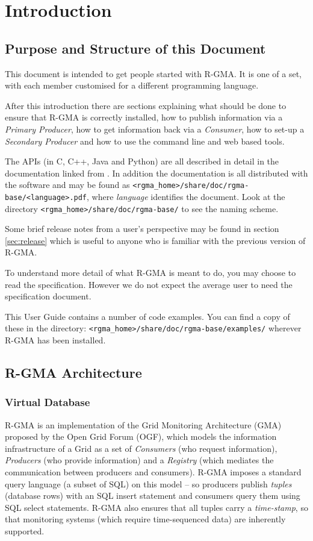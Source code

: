 \section{Introduction} 
\label{sec:Introduction}

\subsection{Purpose and Structure of this Document}

This document is intended to get people started with R-GMA. It is one
of a set, with each member customised for a different programming
language.

After this introduction there are sections explaining what should be
done to ensure that R-GMA is correctly installed, how to publish
information via a \emph{Primary Producer}, how to get information back
via a \emph{Consumer}, how to set-up a \emph{Secondary Producer} and
how to use the command line and web based tools.

The APIs (in C, C++, Java and Python) are all described in detail in
the documentation linked from \toppage. In addition the documentation
is all distributed with the software and may be found as
\verb!<rgma_home>/share/doc/rgma-base/<language>.pdf!, where
\emph{language} identifies the document.  Look at the directory
\verb!<rgma_home>/share/doc/rgma-base/!  to see the naming scheme.

Some brief release notes from a user's perspective may be found in
section \ref{sec:release} which is useful to anyone who is familiar
with the previous version of R-GMA.

To understand more detail of what R-GMA is meant to do, you may choose
to read the specification\cite{ref:EGEE-RGMA-SPEC}. However we do not
expect the average user to need the specification document.

This User Guide contains a number of code examples. You can find a
copy of these in the directory:
\verb!<rgma_home>/share/doc/rgma-base/examples/! wherever R-GMA has
been installed.

\subsection{R-GMA Architecture}
\subsubsection{Virtual Database}
R-GMA is an implementation of the Grid Monitoring Architecture (GMA)
proposed by the Open Grid Forum (OGF), which models the information
infrastructure of a Grid as a set of \emph{Consumers} (who request
information), \emph{Producers} (who provide information) and a
\emph{Registry} (which mediates the communication between producers
and consumers). R-GMA imposes a standard query language (a subset of
SQL) on this model -- so producers publish \emph{tuples} (database
rows) with an SQL insert statement and consumers query them using SQL
select statements.  R-GMA also ensures that all tuples carry a
\emph{time-stamp}, so that monitoring systems (which require
time-sequenced data) are inherently supported.

